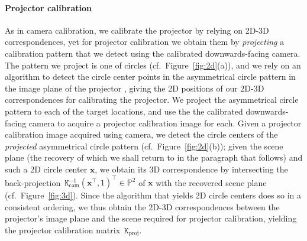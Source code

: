 \documentclass[review]{elsarticle}
\begin{document}
\paragraph{Projector calibration} As in camera calibration, we calibrate the projector by relying on 2D-3D correspondences, yet for projector calibration we obtain them by \textit{projecting} a calibration pattern that we detect using the calibrated downwards-facing camera. The pattern we project is one of circles (cf.\ Figure~\ref{fig:2d}(a)), and we rely on an algorithm to detect the circle center points in the asymmetrical circle pattern in the image plane of the projector \cite{bradski2000opencv}, giving the 2D positions of our 2D-3D correspondences for calibrating the projector. We project the asymmetrical circle pattern to each of the target locations, and use the the calibrated downwards-facing camera to acquire a projector calibration image for each. Given a projector calibration image acquired using camera, we detect the circle centers of the \textit{projected} asymmetrical circle pattern (cf.\ Figure~\ref{fig:2d}(b)); given the scene plane (the recovery of which we shall return to in the paragraph that follows) and such a 2D circle center $\mathbf{x}$, we obtain its 3D correspondence by intersecting the back-projection~$\mathtt{K}_\text{cam}^{-1}(\mathbf{x}^\top, 1)^\top \in \mathbb{P}^2$ of $\mathbf{x}$ with the recovered scene plane (cf.\ Figure~\ref{fig:3d}). Since the algorithm that yields 2D circle centers does so in a consistent ordering, we thus obtain the 2D-3D correspondences between the projector's image plane and the scene required for projector calibration, yielding the projector calibration matrix~$\mathtt{K}_\text{proj}$.
\end{document}
